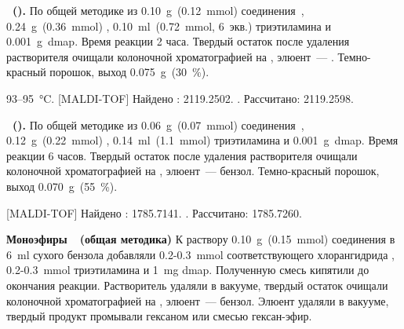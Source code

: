 \textbf{~().} 
По общей методике из \SI{0.10}{\gram}~(\SI{0.12}{\milli\mole}) соединения~, \SI{0.24}{\gram}~(\SI{0.36}{\milli\mole}) , \SI{0.10}{\milli\litre}~(\SI{0.72}{\milli\mole}, 6~экв.) триэтиламина и \SI{0.001}{\gram}~\ac{dmap}.
Время реакции 2 часа. Твердый остаток после удаления растворителя очищали колоночной хроматографией на , элюент~--- .
Темно-красный порошок, выход \SI{0.075}{\gram}~(\SI{30}{\percent}).
\begin{experimental}
     93--\SI{95}{\celsius}.
    [MALDI-TOF] Найдено \ce{[M - H]-}: \num{2119.2502}. . Рассчитано: \ce{[M - H]} \num{2119.2598}.
\end{experimental}

\textbf{~().}
По общей методике из \SI{0.06}{\gram}~(\SI{0.07}{\milli\mole}) соединения~, \SI{0.12}{\gram}~(\SI{0.22}{\milli\mole}) , \SI{0.14}{\milli\litre}~(\SI{1.1}{\milli\mole}) триэтиламина и \SI{0.001}{\gram}~\ac{dmap}.
Время реакции 6 часов. Твердый остаток после удаления растворителя очищали колоночной хроматографией на , элюент~--- бензол.
Темно-красный порошок, выход \SI{0.070}{\gram}~(\SI{55}{\percent}).
\begin{experimental}
    [MALDI-TOF] Найдено \ce{[M + H]+}: \num{1785.7141}. . Рассчитано: \ce{[M + H]} \num{1785.7260}.
\end{experimental}

\textbf{Моноэфиры~~(общая методика)}
К раствору \SI{0.10}{\gram}~(\SI{0.15}{\milli\mole}) соединения  в \SI{6}{\milli\litre} сухого бензола добавляли 0.2-0.3~\si{\milli\mole} соответствующего хлорангидрида , 0.2-0.3~\si{\milli\mole} триэтиламина и \SI{1}{\milli\gram} \ac{dmap}.
Полученную смесь кипятили до окончания реакции.
Растворитель удаляли в вакууме, твердый остаток очищали колоночной хроматографией на , элюент~--- бензол.
Элюент удаляли в вакууме, твердый продукт промывали гексаном или смесью гексан-эфир.

